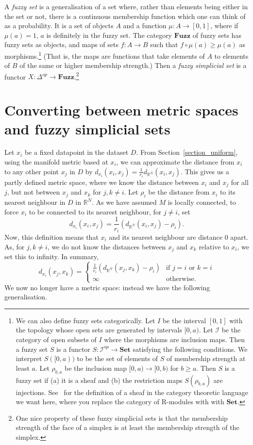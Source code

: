 \documentclass[a4paper,11pt,leqno]{article}
\newcommand{\RR}{\mathbb{R}}
\newcommand{\curI}{\mathscr{I}}
\newcommand{\of}{\circ}
\theoremstyle{definition}
\begin{document}
A \emph{fuzzy set} is a generalisation of a set where, rather than elements being either in the set or not, there is a continuous membership function which one can think of as a probability.
It is a set of objects $A$ and a function $\mu: A\to [0, 1]$, where if $\mu(a) = 1$, $a$ is definitely in the fuzzy set.
The category $\textbf{Fuzz}$ of fuzzy sets has fuzzy sets as objects, and maps of sets $f: A\to B$ such that $f\of \mu(a) \geq \mu(a)$ as morphisms.\footnote{
We can also define fuzzy sets categorically. Let $I$ be the interval $[0, 1]$ with the topology whose open sets are generated by intervals $[0, a)$.
Let $\curI$ be the category of open subsets of $I$ where the morphisms are inclusion maps.
Then a fuzzy set $S$ is a functor $S: \curI^{op}\to \textbf{Set}$ satisfying the following conditions. We interpret $S([0, a))$ to be the set of elements of $S$ of membership strength at least $a$. Let $\rho_{b, a}$ be the inclusion map $[0, a)\to [0, b)$ for $b\geq a$. Then $S$ is a fuzzy set if (a) it is a sheaf and (b) the restriction maps $S(\rho_{b, a})$ are injections. See~\cite{Weng} for the definition of a sheaf in the category theoretic language we want here, where you replace the category of R-modules with with $\textbf{Set}$.}
(That is, the maps are functions that take elements of $A$ to elements of $B$ of the same or higher membership strength.)
Then a \emph{fuzzy simplicial set} is a functor $X: \Delta^{op}\to \textbf{Fuzz}$.\footnote{
One nice property of these fuzzy simplicial sets is that the membership strength of the face of a simplex is at least the membership strength of the simplex.}

\section{Converting between metric spaces and fuzzy simplicial sets}
\label{section_adjunction}

Let $x_i$ be a fixed datapoint in the dataset $D$.
From Section~\ref{section_uniform}, using the manifold metric based at $x_i$, we can approximate the distance from $x_i$ to any other point $x_j$ in $D$ by $d_{x_i}(x_i, x_j) = \frac{1}{r_i}d_{\RR^N}(x_i, x_j)$.
This gives us a partly defined metric space, where we know the distance between $x_i$ and $x_j$ for all $j$, but not between $x_j$ and $x_k$ for $j, k\not= i$.
Let $\rho_i$ be the distance from $x_i$ to its nearest neighbour in $D$ in $\RR^N$.
As we have assumed $M$ is locally connected, to force $x_i$ to be connected to its nearest neighbour, for $j\not= i$, set $$d_{x_i}(x_i, x_j) = \frac{1}{r_i}(d_{\RR^N}(x_i, x_j)-\rho_i).$$
Now, this definition means that $x_i$ and its nearest neighbour are distance 0 apart.
As, for $j, k\not= i$, we do not know the distances between $x_j$ and $x_k$ relative to $x_i$, we set this to infinity.
In summary,
$$d_{x_i}(x_j, x_k) = \begin{cases}
	\frac{1}{r_i}(d_{\RR^N}(x_j, x_k)-\rho_i) & \text{if $j = i$ or $k = i$}\\
	\infty	& \text{otherwise.}
\end{cases}$$
We now no longer have a metric space: instead we have the following generalisation.
\end{document}
